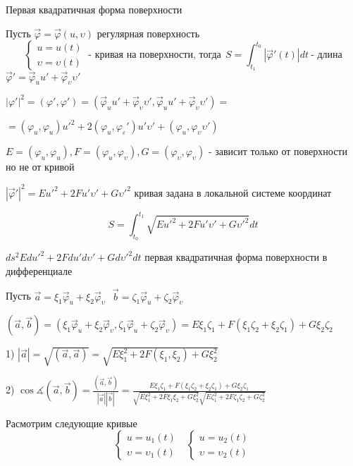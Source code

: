 \begin{title}
  Первая квадратичная форма поверхности
\end{title}

Пусть $\vec \varphi = \vec \varphi(u, \upsilon)$ регулярная поверхность
$$
\left\{
  \begin{array}{l}
    u = u(t) \\
    \upsilon = \upsilon(t)
  \end{array}
\right. ~ \text{- кривая на поверхности, тогда} ~~
S = \int_{t_1}^{t_0} |\vec \varphi'(t)| dt ~ \text{- длина}
$$
$\vec \varphi' = \vec \varphi_u u' + \vec \varphi_{\upsilon} \upsilon'$

$
|\varphi'|^2 = (\varphi', \varphi') =
(\vec \varphi_u u' + \vec \varphi_{\upsilon} \upsilon',
\vec \varphi_u u' + \vec \varphi_{\upsilon} \upsilon') =
$

$
= (\varphi_u, \varphi_u)u'^2 + 2(\varphi_u, \varphi_{\varepsilon}')
u' \upsilon' + (\varphi_u, \varphi_{\upsilon} \upsilon')
$

$E = (\varphi_u, \varphi_u), F = (\varphi_u, \varphi_{\upsilon}),
G = (\varphi_{\upsilon}, \varphi_{\upsilon})$ - зависит только от поверхности
но не от кривой

$|\vec \varphi'|^2 = E u'^2 + 2Fu'\upsilon' + G\upsilon'^2$ кривая задана в
локальной системе координат

$$
S = \int_{t_0}^{t_1} \sqrt{E u'^2 + 2Fu'\upsilon' + G\upsilon'^2}dt
$$

$ds^2 Edu'^2 + 2Fdu'd\upsilon' + Gd\upsilon'^2dt$ первая квадратичная форма
поверхности в дифференциале

Пусть $\vec a = \xi_1 \vec \varphi_u + \xi_2 \vec \varphi_{\upsilon} ~~~
\vec b = \zeta_1 \vec \varphi_u + \zeta_2 \vec \varphi_{\upsilon}$

$(\vec a, \vec b) = (\xi_1 \vec \varphi_u + \xi_2 \vec \varphi_{\upsilon},
\zeta_1 \vec \varphi_u + \zeta_2 \vec \varphi_{\upsilon}) =
E \xi_1 \zeta_1 + F(\xi_1 \zeta_2 + \xi_2 \zeta_1) + G\xi_2 \zeta_2$

1) $|\vec a| = \sqrt{(\vec a, \vec a)} = \sqrt{E\xi_1^2 + 2F(\xi_1, \xi_2) +
G\xi_2^2}$

2) $\cos \measuredangle (\vec a, \vec b) =
\frac{(\vec a, \vec b)}{|\vec a||\vec b|} =
\frac{E \xi_1 \zeta_1 + F(\xi_1 \zeta_2 + \xi_2 \zeta_1) + G\xi_2 \zeta_1}
{\sqrt{E\xi_1^2 + 2F\xi_1\xi_2 + G\xi_2^2}
\sqrt{E\zeta_1^2 + 2F\zeta_1\zeta_2 + G\zeta_2^2}}$

Расмотрим следующие кривые
$$
\left\{
  \begin{array}{l}
    u = u_1(t) \\
    \upsilon = \upsilon_1(t)
  \end{array}
\right. ~~~
\left\{
  \begin{array}{l}
    u = u_2(t) \\
    \upsilon = \upsilon_2(t)
  \end{array}
\right.
$$

